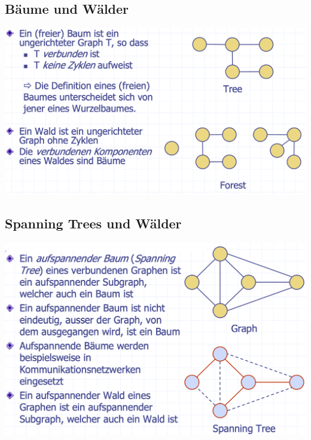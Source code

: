 \subsection{Bäume und Wälder}
\begin{center}
    \includegraphics[scale=.23]{graphic/11 Graph/Bäume und Wälder1.png}
\end{center}
\vspace{-8pt}


\subsection{Spanning Trees und Wälder}
\begin{center}
    \includegraphics[scale=.25]{graphic/11 Graph/Bäume und Wälder2.png}
\end{center}
\vspace{-8pt}

\newpage
